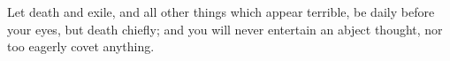 Let  death and  exile, and  all other  things which  appear terrible,  be daily
before your  eyes, but death  chiefly; and you  will never entertain  an abject
thought, nor too eagerly covet anything.
